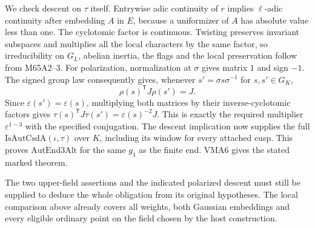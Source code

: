 We check descent on $\tau$ itself. Entrywise adic continuity of $r$
implies $\ell$-adic continuity after embedding $A$ in $E$, because
a uniformizer of $A$ has absolute value less than one. The
cyclotomic factor is continuous. Twisting preserves invariant
subspaces and multiplies all the local characters by the same
factor, so irreducibility on $G_L$, abelian inertia, the flags and
the local preservation follow from M65A2--3. For polarization,
normalization at $\sigma$ gives matrix $1$ and sign $-1$.
The signed group law consequently gives, whenever
$s'=\sigma s\sigma^{-1}$ for $s,s'\in G_K$,
\[
                   \rho(s)^{\mathsf T}J\rho(s')=J .
\]
Since $\varepsilon(s')=\varepsilon(s)$, multiplying both
matrices by their inverse-cyclotomic factors gives
$\tau(s)^{\mathsf T}J\tau(s')=\varepsilon(s)^{-2}J$.
This is exactly the required multiplier $\varepsilon^{1-3}$
with the specified conjugation. The descent implication now
supplies the full $\mathrm{IsAutCsdA}(\iota,\tau)$ over $K$,
including its window for every attached cusp. This proves
$\mathrm{AutEnd3Alt}$ for the same $g_1$ as the finite end.
VMA6 gives the stated marked theorem.

The two upper-field assertions and the indicated polarized descent
must still be supplied to deduce the whole obligation from its
original hypotheses. The local comparison above already covers
all weights, both Gaussian embeddings and every eligible ordinary point
on the field chosen by the host construction.
